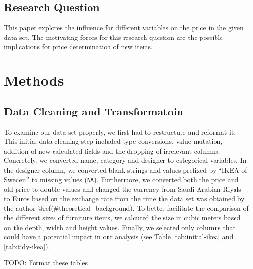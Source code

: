 \documentclass[a4paper, nobind]{templates/ociamthesis}
\begin{document}
\hypertarget{research_question}{%
\section{Research Question}\label{research_question}}

This paper explores the influence for different variables on the price in the given data set. The motivating forces for this research question are the possible implications for price determination of new items.

\hypertarget{methods}{%
\chapter{Methods}\label{methods}}

\hypertarget{datacleaning}{%
\section{Data Cleaning and Transformatoin}\label{datacleaning}}

To examine our data set properly, we first had to restructure and reformat it. This initial data cleaning step included type conversions, value mutation, addition of new calculated fields and the dropping of irrelevant columns.
Concretely, we converted name, category and designer to categorical variables. In the designer column, we converted blank strings and values prefixed by ``IKEA of Sweden'' to missing values (\texttt{NA}). Furthermore, we converted both the price and old price to double values and changed the currency from Saudi Arabian Riyals to Euros based on the exchange rate from the time the data set was obtained by the author @ref(\#theoretical\_background). To better facilitate the comparison of the different sizes of furniture items, we calcuted the size in cubic meters based on the depth, width and height values.
Finally, we selected only columns that could have a potential impact in our analysis (see Table \ref{tab:initial-ikea} and \ref{tab:tidy-ikea}).

TODO: Format these tables
\end{document}

